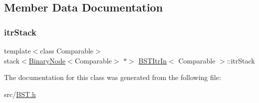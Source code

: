 \subsection{Member Data Documentation}
\mbox{\label{classBSTItrIn_ad7cb5e89f04cf08f5615aa53614dd916}} 
\subsubsection{\texorpdfstring{itr\+Stack}{itrStack}}
{\footnotesize\ttfamily template$<$class Comparable$>$ \\
stack$<$\hyperlink{classBinaryNode}{Binary\+Node}$<$Comparable$>$ $\ast$$>$ \hyperlink{classBSTItrIn}{B\+S\+T\+Itr\+In}$<$ Comparable $>$\+::itr\+Stack\hspace{0.3cm}{\ttfamily [private]}}



The documentation for this class was generated from the following file\+:\begin{DoxyCompactItemize}
\item 
src/\hyperlink{BST_8h}{B\+S\+T.\+h}\end{DoxyCompactItemize}
